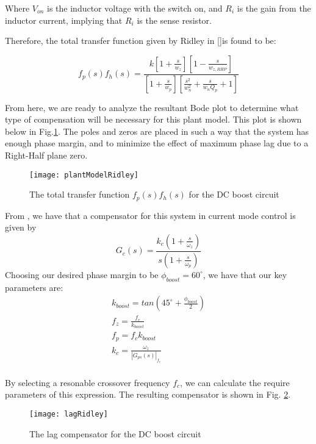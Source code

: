 Where $V_{on}$ is the inductor voltage with the switch on, and $R_i$ is the gain from the inductor current, implying that $R_i$ is the sense resistor.

Therefore, the total transfer function given by Ridley in [\cite{ridley}]is found to be:

\begin{equation}
\label{thirdOrder}
f_p(s)f_h(s)=\frac{k[1 + \frac{s}{w_z}][1 - \frac{s}{w_{z,RHP}}]}{[1 + \frac{s}{w_p}][\frac{s^2}{w_n^2} + \frac{s}{w_nQ_p} + 1]}
\end{equation}

From here, we are ready to analyze the resultant Bode plot to determine what type of compensation will be necessary for this plant model. This plot is shown below in Fig.\ref{plantModelRidley}.
The poles and zeros are placed in such a way that the system has enough phase margin, and to minimize the effect of maximum phase lag due to a Right-Half plane zero.

 \begin{figure}[htbp]
\begin{center}
\texttt{[image: plantModelRidley]}
\caption{The total transfer function $f_p(s)f_h(s)$ for the DC boost circuit}
\label{plantModelRidley}
\end{center}
\end{figure}

From \cite{mohan}, we have that a compensator for this system in current mode control is given by
\begin{equation}
G_c(s) = \frac{k_c(1 + \frac{s}{\omega_z})}{s(1+\frac{s}{\omega_p})}
\end{equation}
Choosing our desired phase margin to be $\phi_{boost} = 60^{\circ}$, we have that our key parameters are:
\begin{gather*}
k_{boost} = tan(45^{\circ}+\frac{\phi_{boost}}{2})\\
f_z = \frac{f_c}{k_{boost}}\\
f_p = f_ck_{boost}\\
k_{c} = \frac{\omega_z}{|G_{ps}(s)|_{f_c}}\\
\end{gather*}

By selecting a resonable crossover frequency $f_c$, we can calculate the require parameters of this expression. The resulting compensator is shown in Fig. \ref{lagRidley}.

\begin{figure}[htbp]
\begin{center}
\texttt{[image: lagRidley]}
\caption{The lag compensator for the DC boost circuit}
\label{lagRidley}
\end{center}
\end{figure}

